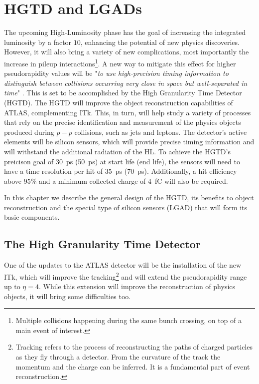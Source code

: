 \chapter{HGTD and LGADs}\label{chap:HGTD_LGADs}

The upcoming High-Luminosity phase has the goal of increasing the integrated luminosity by a factor \(10\), enhancing the potential of new physics discoveries. However, it will also bring a variety of new complications, most importantly the increase in pileup interactions\footnote{Multiple collisions happening during the same bunch crossing, on top of a main event of interest.}.
A new way to mitigate this effect for higher pseudorapidity values will be "\textit{to use high-precision timing information to distinguish between collisions occurring very close in space but well-separated in time}" \cite{CERN-LHCC-2020-007}. This is set to be accomplished by the High Granularity Time Detector (HGTD).
The HGTD will improve the object reconstruction capabilities of ATLAS, complementing ITk. This, in turn, will help study a variety of processes that rely on the precise identification and measurement of the physics objects produced during \(p-p\) collisions, such as jets and leptons.
The detector's active elements will be silicon sensors, which will provide precise timing information and will withstand the additional radiation of the HL. To achieve the HGTD's preicison goal of \qty{30}{\pico\second} (\qty{50}{\pico\second}) at start life (end life), the sensors will need to have a time resolution per hit of \qty{35}{\pico\second} (\qty{70}{\pico\second}). Additionally, a hit efficiency above \(95\%\) and %
a minimum collected charge of \qty{4}{\femto\coulomb} will also be required.

In this chapter we describe the general design of the HGTD, its benefits to object reconstruction and the special type of silicon sensors (LGAD) that will form its basic components.

\section{The High Granularity Time Detector}\label{sec:HGTD}
One of the updates to the ATLAS detector will be the installation of the new ITk, which will improve the tracking\footnote{Tracking refers to the process of reconstructing the paths of charged particles as they fly through a detector. From the curvature of the track the momentum and the charge can be inferred. It is a fundamental part of event reconstruction.} and will extend the pseudorapidity range up to \(\eta=4\). While this extension will improve the reconstruction of physics objects, it will bring some difficulties too.

